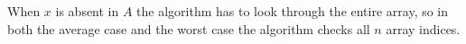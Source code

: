 When $x$ is absent in $A$ the algorithm has to look through the entire array, so in both the average case and the worst case the algorithm checks all $n$ array indices.
